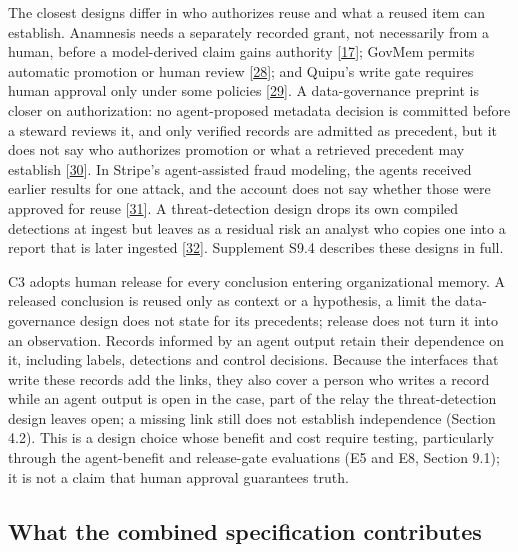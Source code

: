 \documentclass[acmlarge,nonacm]{acmart}
\begin{document}
The closest designs differ in who authorizes reuse and what a reused
item can establish. Anamnesis needs a separately recorded grant, not
necessarily from a human, before a model-derived claim gains authority
{[}\protect\hyperlink{ref-Dan2026Anamnesis}{17}{]}; GovMem permits
automatic promotion or human review
{[}\protect\hyperlink{ref-Qi2026GovMem}{28}{]}; and Quipu's write gate
requires human approval only under some policies
{[}\protect\hyperlink{ref-Brown2026Quipu}{29}{]}. A data-governance
preprint is closer on authorization: no agent-proposed metadata decision
is committed before a steward reviews it, and only verified records are
admitted as precedent, but it does not say who authorizes promotion or
what a retrieved precedent may establish
{[}\protect\hyperlink{ref-Akhtar2026Contestable}{30}{]}. In Stripe's
agent-assisted fraud modeling, the agents received earlier results for
one attack, and the account does not say whether those were approved for
reuse {[}\protect\hyperlink{ref-Drapeau2026ScalingRadar}{31}{]}. A
threat-detection design drops its own compiled detections at ingest but
leaves as a residual risk an analyst who copies one into a report that
is later ingested
{[}\protect\hyperlink{ref-Evron2026AdversaryBrains}{32}{]}. Supplement
S9.4 describes these designs in full.

C3 adopts human release for every conclusion entering organizational
memory. A released conclusion is reused only as context or a hypothesis,
a limit the data-governance design does not state for its precedents;
release does not turn it into an observation. Records informed by an
agent output retain their dependence on it, including labels, detections
and control decisions. Because the interfaces that write these records
add the links, they also cover a person who writes a record while an
agent output is open in the case, part of the relay the threat-detection
design leaves open; a missing link still does not establish independence
(Section 4.2). This is a design choice whose benefit and cost require
testing, particularly through the agent-benefit and release-gate
evaluations (E5 and E8, Section 9.1); it is not a claim that human
approval guarantees truth.

\hypertarget{what-the-combined-specification-contributes}{%
\subsection{What the combined specification
contributes}\label{what-the-combined-specification-contributes}}
\end{document}
